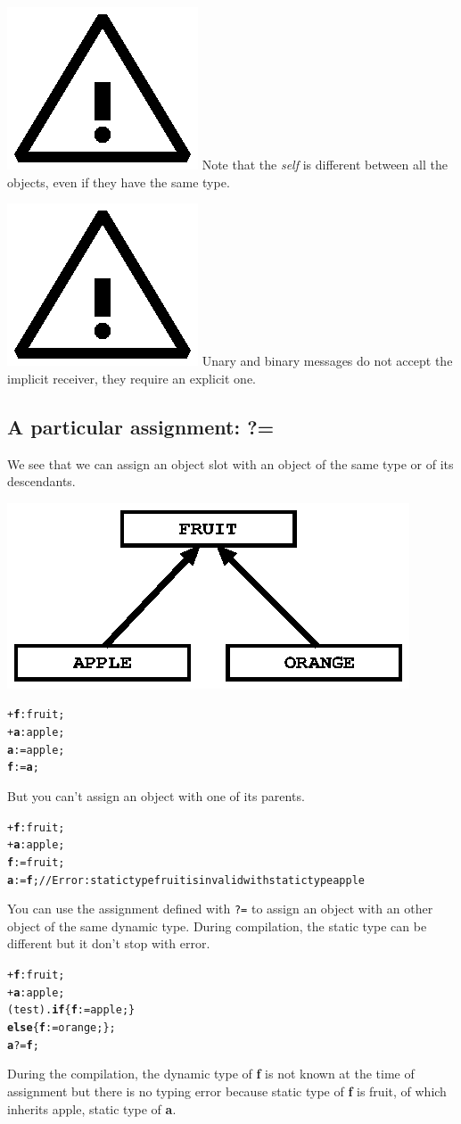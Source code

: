 \documentclass[11pt]{mybook}
\newcommand{\warning}{\includegraphics[scale=0.3]{figures/warning}}
\begin{document}
\warning{} Note that the {\it{}self} is different between all the objects, even if they have the same type.

\warning{} Unary and binary messages do not accept the 
implicit receiver, they require an explicit one.

\subsection{A particular assignment: ?=}
\label{language_reference:slot_evaluation:assignment_same_type}
We see that we can assign an object slot with an object of the same type or of its descendants.
\begin{center}
\includegraphics[scale=1.0]{figures/assignment_same_type1}
\end{center}
\begin{alltt}
   + {\bf{}f}:{\sc{}fruit};
   + {\bf{}a}:{\sc{}apple};
   {\bf{}a} := {\sc{}apple};
   {\bf{}f} := {\bf{}a};
\end{alltt}

But you can't assign an object with one of its parents.
\begin{alltt}
   + {\bf{}f}:{\sc{}fruit};
   + {\bf{}a}:{\sc{}apple};
   {\bf{}f} := {\sc{}fruit};
   {\bf{}a} := {\bf{}f};    // Error: static type {\sc{}fruit} is invalid with static type {\sc{}apple}
\end{alltt}

You can use the assignment defined with {\tt ?=} to assign an object with an other object of the same dynamic type. During compilation, the static type can be different but it don't stop with error.
\begin{alltt}
   + {\bf{}f}:{\sc{}fruit};
   + {\bf{}a}:{\sc{}apple};
   (test).{\bf{}if} \{ {\bf{}f} := {\sc{}apple};  \}
   {\bf{}else}      \{ {\bf{}f} := {\sc{}orange}; \};
   {\bf{}a} ?= {\bf{}f};
\end{alltt}
During the compilation, the dynamic type of {\bf{}f} is not known at the time of assignment but there is no typing error because static type of {\bf{}f} is {\sc{}fruit}, of which inherits {\sc{}apple}, static type of {\bf{}a}.
\end{document}
